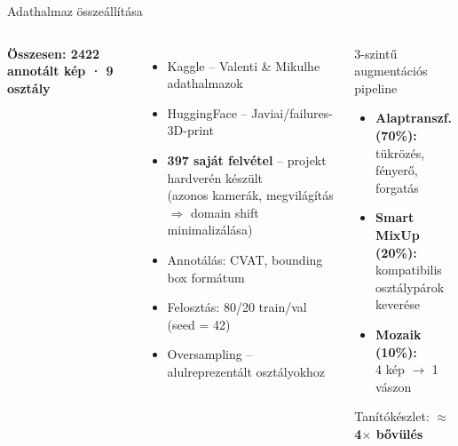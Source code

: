 \documentclass[aspectratio=169]{beamer}
\begin{document}
\begin{frame}{Adathalmaz összeállítása}
  \begin{columns}[T]
      \textbf{\textcolor{primary}{Összesen: 2422 annotált kép · 9 osztály}}
      \vspace{0.4em}
      \begin{itemize}
        \setlength\itemsep{0.4em}
        \item Kaggle – Valenti \& Mikulhe adathalmazok
        \item HuggingFace – Javiai/failures-3D-print
        \item \textbf{397 saját felvétel} – projekt hardverén készült\\
              {\footnotesize(azonos kamerák, megvilágítás $\Rightarrow$ domain shift minimalizálása)}
        \item Annotálás: CVAT, bounding box formátum
        \item Felosztás: 80/20 train/val (seed = 42)
        \item Oversampling – alulreprezentált osztályokhoz
      \end{itemize}
      \begin{alertblock}{3-szintű augmentációs pipeline}
        \setlength\itemsep{0.3em}
        \begin{itemize}
          \item \textbf{Alaptranszf. (70\%):}\\
                tükrözés, fényerő, forgatás
          \item \textbf{Smart MixUp (20\%):}\\
                kompatibilis osztálypárok keverése
          \item \textbf{Mozaik (10\%):}\\
                4 kép $\rightarrow$ 1 vászon
        \end{itemize}
        \vspace{0.3em}
        \centering Tanítókészlet: \textbf{$\approx$4$\times$ bővülés}
      \end{alertblock}
    \end{columns}
\end{frame}
\end{document}
